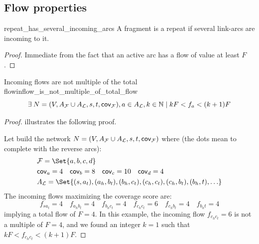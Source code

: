 \subsection{Flow properties}

\begin{proposition}{}{repeat_has_several_incoming_arcs}
  A fragment is a repeat if several link-arcs are incoming to it.
\end{proposition}

\begin{proof}
  Immediate from the fact that an active arc has a flow of value at least \(F\).
\end{proof}

\begin{proposition}{Incoming flows are not multiple of the total flow}{inflow_is_not_multiple_of_total_flow}
  \[
    \exists N = (V, A_\Fragments{} \cup A_\Links{}, s, t, \cov{\Fragments{}}), a \in A_\Links{}, k \in \Naturals{}
    \mid k F < f_a < (k + 1) F
  \]
\end{proposition}

\begin{proof}
   illustrates the following proof.

  Let build the network \(N = (V, A_{\mathcal{F}}{} \cup A_{\mathcal{L}}{}, s, t, \mathsf{cov}_{\mathcal{F}{}})\) where (the dots mean to complete with the reverse arcs):
  \begin{align*}
    & \Fragments{} = \Set{a, b, c, d} \\
    & \cov{a} = 4 \quad \cov{b} = 8 \quad \cov{c} = 10 \quad \cov{d} = 4 \\
    & A_\Links{} = \Set{
      (s, a_t), (a_h, b_t), (b_h, c_t), (c_h, c_t), (c_h, b_t), (b_h, t), \ldots
    }
  \end{align*}
  The incoming flows maximizing the coverage score are:
  \[
    f_{s a_t} = 4 \quad f_{a_h b_t} = 4 \quad f_{b_h c_t} = 4 \quad f_{c_h c_t} = 6 \quad f_{c_h b_t} = 4 \quad f_{b_h t} = 4
  \] implying a total flow of \(F = 4\).
  In this example, the incoming flow \(f_{c_h c_t} = 6\) is not a multiple of \(F = 4\), and we found an integer \(k = 1\) such that \(k F < f_{c_h c_t} < (k + 1) F\).
\end{proof}

